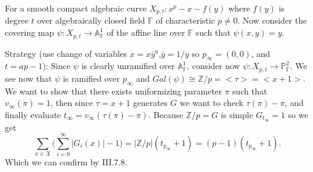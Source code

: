 \documentclass[paper=a4, fontsize=11pt]{scrartcl} %
\numberwithin{equation}{section} %
\numberwithin{figure}{section} %
\numberwithin{table}{section} %
\theoremstyle{break}
\begin{document}
For a smooth compact algebraic curve $X_{p,t}: x^p - x - f(y)$ where $f(y)$ is degree $t$ over algebraically closed field $\mathbb{F}$ of characteristic $p \not= 0$. Now consider the covering map $\psi: X_{p,t} \to \mathbb{A}^1_\mathbb{F}$ of the affine line over $\mathbb{F}$ such that $\psi(x,y)=y$. 

Strategy (use change of variables $x=x\bar{y}^a$,$\bar{y}=1/y$ so $p_\infty = (0,0)$, and $t=ap-1$):
Since $\psi$ is clearly unramified over $\mathbb{A}^1_\mathbb{F}$, consider now $\psi: X_{p,t} \to \mathbb{P}^2_\mathbb{F}$. We see now that $\psi$ is ramified over $p_\infty$ and $Gal(\psi)\cong \mathbb{Z}/p = <\tau>=<x+1>$. We want to show that there exists uniformizing parameter $\pi$ such that $v_\infty(\pi) = 1$, then since $\tau=x+1$ generates $G$ we want to check $\tau(\pi)-\pi$, and finally evaluate $t_\infty = v_{\infty}(\tau(\pi)-\pi)$. Because $\mathbb{Z}/p = G$ is simple $G_{t_\infty}={1}$ so we get 
$$
\sum_{x\in X} \big( \sum^{\infty}_{i=0}|G_i(x)| -1 \big) = |\mathbb{Z}/p|(t_{p_\infty} + 1)=(p-1)(t_{p_\infty} + 1).
$$
Which we can confirm by \cite{stitchenoth} III.7.8.
\nocite{*}
\printbibliography
\end{document}
